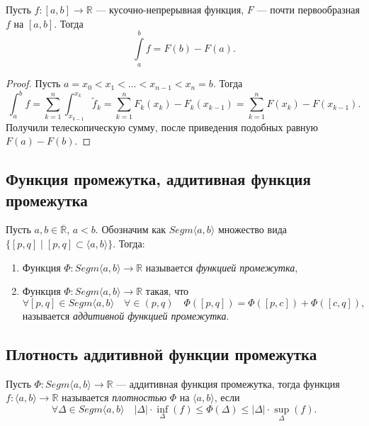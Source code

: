 \begin{nremark}
	Пусть \(f \colon [a, b] \to \mathbb{R}\) --- кусочно-непрерывная функция, \(F\) --- почти первообразная \(f\) на \([a, b]\). Тогда \[
	\int\limits_a^b f = F(b) - F(a).
	\]
\end{nremark}
\begin{proof}
	Пусть \(a = x_0 < x_1 < \ldots < x_{n - 1} < x_n = b\). Тогда \[
	\int_a^b f = \sum_{k = 1}^n \int_{x_{k - 1}}^{x_k} \widetilde{f}_k = \sum_{k = 1}^n F_k(x_k) - F_k (x_{k - 1}) = \sum_{k = 1}^n F(x_k) - F(x_{k - 1}).
	\]
	Получили телескопическую сумму, после приведения подобных равную \(F(a) - F(b)\).
\end{proof}

\subsection{Функция промежутка, аддитивная функция промежутка}

\begin{definition}
	Пусть \(a, b \in \overline{\mathbb{R}}\), \(a < b\). Обозначим как \(Segm \langle a, b \rangle\) множество вида \(\{[p, q] \mid [p, q] \subset \langle a, b \rangle\}\). Тогда:
	\begin{enumerate}
		\item Функция \(\Phi \colon Segm \langle a, b \rangle \to \mathbb{R}\) называется \textit{функцией промежутка},
		\item Функция \(\Phi \colon Segm \langle a, b \rangle \to \mathbb{R}\) такая, что \[
		\forall [p, q] \in Segm \langle a, b \rangle \quad \forall \in (p, q) \quad \Phi([p, q]) = \Phi([p, c]) + \Phi([c, q]),
		\]
		называется \textit{аддитивной функцией промежутка}.
	\end{enumerate}
\end{definition}

\subsection{Плотность аддитивной функции промежутка}

\begin{definition}
	Пусть \(\Phi \colon Segm \langle a, b \rangle \to \mathbb{R}\) --- аддитивная функция промежутка, тогда функция \(f: \langle a, b \rangle \to \mathbb{R}\) называется \textit{плотностью} \(\Phi\) на \(\langle a, b \rangle\), если \[
	\forall \Delta \in Segm \langle a, b \rangle \quad |\Delta| \cdot \inf_\Delta(f) \leqslant \Phi(\Delta) \leqslant |\Delta| \cdot \sup_\Delta(f).
	\]
\end{definition}

